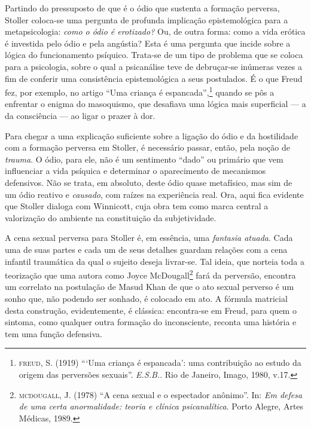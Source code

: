 Partindo do pressuposto de que é o ódio que sustenta a formação
perversa, Stoller coloca-se uma pergunta de profunda implicação
epistemológica para a metapsicologia: \emph{como o ódio é erotizado?}
Ou, de outra forma: como a vida erótica é investida pelo ódio e pela
angústia? Esta é uma pergunta que incide sobre a lógica do funcionamento
psíquico. Trata-se de um tipo de problema que se coloca para a
psicologia, sobre o qual a psicanálise teve de debruçar-se inúmeras
vezes a fim de conferir uma consistência epistemológica a seus
postulados. É o que Freud fez, por exemplo, no artigo ``Uma criança é
espancada'',\footnote{\textsc{freud}, S. (1919) ```Uma criança é
  espancada': uma contribuição ao estudo da origem das perversões
  sexuais''. \emph{E.S.B.}. Rio de Janeiro, Imago, 1980, v.17.} quando
se pôs a enfrentar o enigma do masoquismo, que desafiava uma lógica mais
superficial --- a da consciência --- ao ligar o prazer à dor.

Para chegar a uma explicação suficiente sobre a ligação do ódio e da
hostilidade com a formação perversa em Stoller, é necessário passar,
então, pela noção de \emph{trauma}. O ódio, para ele, não é um
sentimento ``dado'' ou primário que vem influenciar a vida psíquica e
determinar o aparecimento de mecanismos defensivos. Não se trata, em
absoluto, deste ódio quase metafísico, mas sim de um ódio reativo e
\emph{causado}, com raízes na experiência real. Ora, aqui fica evidente
que Stoller dialoga com Winnicott, cuja obra tem como marca central a
valorização do ambiente na constituição da subjetividade.

A cena sexual perversa para Stoller é, em essência, uma \emph{fantasia
atuada}. Cada uma de suas partes e cada um de seus detalhes guardam
relações com a cena infantil traumática da qual o sujeito deseja
livrar-se. Tal ideia, que norteia toda a teorização que uma autora como
Joyce McDougall\footnote{\textsc{mcdougall}, J. (1978) ``A cena sexual e
  o espectador anônimo''. In: \emph{Em defesa de uma certa anormalidade:
  teoria e clínica psicanalítica}. Porto Alegre, Artes Médicas, 1989.}
fará da perversão, encontra um correlato na postulação de Masud Khan de
que o ato sexual perverso é um sonho que, não podendo ser sonhado, é
colocado em ato. A fórmula matricial desta construção, evidentemente, é
clássica: encontra-se em Freud, para quem o sintoma, como qualquer outra
formação do inconsciente, reconta uma história e tem uma função
defensiva.

